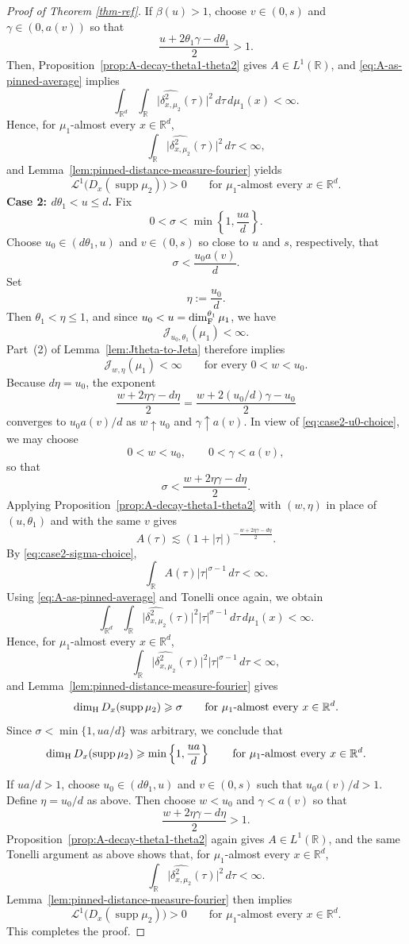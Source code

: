 \documentclass[11pt]{amsart}
\numberwithin{equation}{section}
\renewcommand{\ge}{\geqslant}
\renewcommand{\le}{\leqslant}
\newcommand{\hd}{\dim_{\textup{H}}}
\newcommand{\J}{\mathcal{J}}
\theoremstyle{plain}
\theoremstyle{remark}
\newcommand{\R}{\mathbb{R}}
\newcommand{\Rd}{\mathbb{R}^d}
\newcommand{\supp}{\operatorname{supp}}
\newcommand{\cL}{\mathcal{L}}
\begin{document}
\begin{proof}[Proof of Theorem \ref{thm-ref}]
If $\beta(u)>1$, choose $v\in(0,s)$ and $\gamma\in(0,a(v))$ so that
\[
\frac{u+2\theta_1\gamma-d\theta_1}{2}>1.
\]
Then, Proposition~\ref{prop:A-decay-theta1-theta2} gives $A\in L^1(\R)$, and \eqref{eq:A-as-pinned-average} implies
\[
\int_{\Rd}\int_{\R}\bigl|\widehat{\delta_{x,\mu_2}^2}(\tau)\bigr|^2\,d\tau\,d\mu_1(x)<\infty.
\]
Hence, for $\mu_1$-almost every $x\in\Rd$,
\[
\int_{\R}\bigl|\widehat{\delta_{x,\mu_2}^2}(\tau)\bigr|^2\,d\tau<\infty,
\]
and Lemma~\ref{lem:pinned-distance-measure-fourier} yields
\[
\cL^1\bigl(D_x(\supp\mu_2)\bigr)>0
\qquad\text{for $\mu_1$-almost every }x\in\Rd.
\]
\textbf{Case 2: $d\theta_1<u\le d$.}
Fix
\[
0<\sigma<\min\left\{1,\frac{ua}{d}\right\}.
\]
Choose $u_0\in(d\theta_1,u)$ and $v\in(0,s)$ so close to $u$ and $s$, respectively, that
\begin{equation}\label{eq:case2-u0-choice}
\sigma<\frac{u_0a(v)}{d}.
\end{equation}
Set
\[
\eta:=\frac{u_0}{d}.
\]
Then $\theta_1<\eta\le 1$, and since $u_0<u=\dim_\textup{F}^{\theta_1} \mu_1$, we have
\[
\J_{u_0,\theta_1}(\mu_1)<\infty.
\]
Part~(2) of Lemma~\ref{lem:Jtheta-to-Jeta} therefore implies
\[
\J_{w,\eta}(\mu_1)<\infty
\qquad\text{for every }0<w<u_0.
\]
Because $d\eta=u_0$, the exponent
\[
\frac{w+2\eta\gamma-d\eta}{2}
=
\frac{w+2(u_0/d)\gamma-u_0}{2}
\]
converges to $u_0a(v)/d$ as $w\uparrow u_0$ and $\gamma\uparrow a(v)$. In view of
\eqref{eq:case2-u0-choice}, we may choose
\[
0<w<u_0,
\qquad
0<\gamma<a(v),
\]
so that
\begin{equation}\label{eq:case2-sigma-choice}
\sigma<\frac{w+2\eta\gamma-d\eta}{2}.
\end{equation}
Applying Proposition~\ref{prop:A-decay-theta1-theta2} with $(w,\eta)$ in place of $(u,\theta_1)$ and with the same $v$ gives
\[
A(\tau)\lesssim (1+|\tau|)^{-\frac{w+2\eta\gamma-d\eta}{2}}.
\]
By \eqref{eq:case2-sigma-choice},
\[
\int_{\R}A(\tau)|\tau|^{\sigma-1}\,d\tau<\infty.
\]
Using \eqref{eq:A-as-pinned-average} and Tonelli once again, we obtain
\[
\int_{\Rd}\int_{\R}\bigl|\widehat{\delta_{x,\mu_2}^2}(\tau)\bigr|^2|\tau|^{\sigma-1}\,d\tau\,d\mu_1(x)<\infty.
\]
Hence, for $\mu_1$-almost every $x\in\Rd$,
\[
\int_{\R}\bigl|\widehat{\delta_{x,\mu_2}^2}(\tau)\bigr|^2|\tau|^{\sigma-1}\,d\tau<\infty,
\]
and Lemma~\ref{lem:pinned-distance-measure-fourier} gives
\[
\hd D_x(\supp\mu_2)\ge \sigma
\qquad\text{for $\mu_1$-almost every }x\in\Rd.
\]
Since $\sigma<\min\{1,ua/d\}$ was arbitrary, we conclude that
\[
\hd D_x(\supp\mu_2)\ge \min\left\{1,\frac{ua}{d}\right\}
\qquad\text{for $\mu_1$-almost every }x\in\Rd.
\]

If $ua/d>1$, choose $u_0\in(d\theta_1,u)$ and $v\in(0,s)$ such that
$u_0a(v)/d>1$. Define $\eta=u_0/d$ as above. Then choose $w<u_0$ and
$\gamma<a(v)$ so that
\[
\frac{w+2\eta\gamma-d\eta}{2}>1.
\]
Proposition~\ref{prop:A-decay-theta1-theta2} again gives $A\in L^1(\R)$, and the same Tonelli argument as above shows that, for $\mu_1$-almost every $x\in\Rd$,
\[
\int_{\R}\bigl|\widehat{\delta_{x,\mu_2}^2}(\tau)\bigr|^2\,d\tau<\infty.
\]
Lemma~\ref{lem:pinned-distance-measure-fourier} then implies
\[
\cL^1\bigl(D_x(\supp\mu_2)\bigr)>0
\qquad\text{for $\mu_1$-almost every }x\in\Rd.
\]
This completes the proof.
\end{proof}
\end{document}
